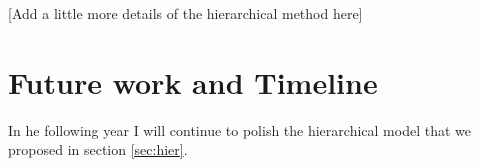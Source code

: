 \documentclass[12pt]{article}
\begin{document}

[Add a little more details of the hierarchical method here]

\section{Future work and Timeline} 


In he following year I will continue to polish the hierarchical model that we proposed in section \ref{sec:hier}. 
\end{document}
